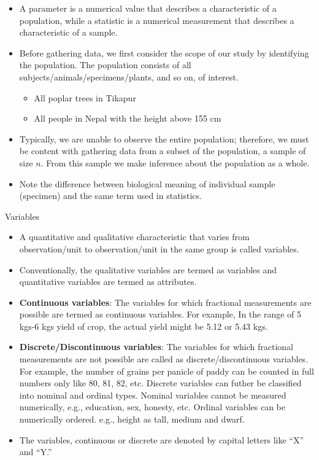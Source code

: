 \documentclass[
  ignorenonframetext,
  aspectratio=169]{beamer}
\providecommand{\tightlist}{%
  \setlength{\itemsep}{0pt}\setlength{\parskip}{0pt}}
\begin{document}
\begin{frame}{}
\protect\hypertarget{section-5}{}
\begin{itemize}
\small
\item A \alert{parameter} is a numerical value that describes a characteristic of a population, while a \alert{statistic} is a numerical measurement that describes a characteristic of a sample.
\item Before gathering data, we first consider the scope of our study by identifying the population. The population consists of all subjects/animals/specimens/plants, and so on, of interest.
  \begin{itemize}
  \footnotesize
  \item All poplar trees in Tikapur
  \item All people in Nepal with the height above 155 cm
  \end{itemize}
\item Typically, we are unable to observe the entire population; therefore, we must be content with gathering data from a subset of the population, a sample of size $n$. From this sample we make inference about the population as a whole.
\item Note the difference between biological meaning of individual sample (specimen) and the same term used in statistics.
\end{itemize}
\end{frame}

\begin{frame}{Variables}
\protect\hypertarget{variables}{}
\begin{itemize}
\tightlist
\item
  A quantitative and qualitative characteristic that varies from
  observation/unit to observation/unit in the same group is called
  variables.
\item
  Conventionally, the qualitative variables are termed as variables and
  quantitative variables are termed as attributes.
\item
  \textbf{Continuous variables}: The variables for which fractional
  measurements are possible are termed as continuous variables. For
  example, In the range of 5 kgs-6 kgs yield of crop, the actual yield
  might be 5.12 or 5.43 kgs.
\item
  \textbf{Discrete/Discontinuous variables}: The variables for which
  fractional measurements are not possible are called as
  discrete/discontinuous variables. For example, the number of grains
  per panicle of paddy can be counted in full numbers only like 80, 81,
  82, etc. Discrete variables can futher be classified into nominal and
  ordinal types. Nominal variables cannot be measured numerically, e.g.,
  education, sex, honesty, etc. Ordinal variables can be numerically
  ordered. e.g., height as tall, medium and dwarf.
\item
  The variables, continuous or discrete are denoted by capital letters
  like ``X'' and ``Y.''
\end{itemize}
\end{frame}
\end{document}
